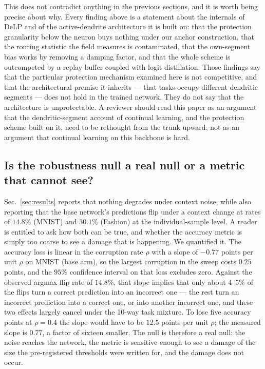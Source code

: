 \documentclass[10pt]{article}
\begin{document}
This does not contradict anything in the previous sections, and it is
worth being precise about why. Every finding above is a statement about
the internals of DeLP and of the active-dendrite architecture it is built
on: that the protection granularity below the neuron buys nothing under
our anchor construction, that the routing statistic the field measures
is contaminated, that the own-segment bias works by removing a damping
factor, and that the whole scheme is outcompeted by a replay buffer
coupled with logit distillation. Those findings say that the particular
protection mechanism examined here is not competitive, and that the
architectural premise it inherits --- that tasks occupy different
dendritic segments --- does not hold in the trained network. They do not
say that the architecture is unprotectable. A reviewer should read this
paper as an argument that the dendritic-segment account of continual
learning, and the protection scheme built on it, need to be rethought
from the trunk upward, not as an argument that continual learning on this
backbone is hard.

\subsection{Is the robustness null a real null or a metric that cannot
see?}
\label{sec:ctrl-metric}

Sec.~\ref{sec:results} reports that nothing degrades under context
noise, while also reporting that the base network's predictions flip
under a context change at rates of $14.8\%$ (MNIST) and $30.1\%$ (Fashion)
at the individual-sample level. A reader is entitled to ask how both can
be true, and whether the accuracy metric is simply too coarse to see a
damage that is happening. We quantified it. The accuracy loss is linear
in the corruption rate $\rho$ with a slope of $-0.77$ points per unit
$\rho$ on MNIST (base arm), so the largest corruption in the sweep costs
$0.25$ points, and the $95\%$ confidence interval on that loss excludes
zero. Against the observed argmax flip rate of $14.8\%$, that slope
implies that only about $4$--$5\%$ of the flips turn a correct prediction
into an incorrect one --- the rest turn an incorrect prediction into a
correct one, or into another incorrect one, and these two effects
largely cancel under the 10-way task mixture. To lose five accuracy
points at $\rho=0.4$ the slope would have to be $12.5$ points per unit
$\rho$; the measured slope is $0.77$, a factor of sixteen smaller. The
null is therefore a real null: the noise reaches the network, the metric
is sensitive enough to see a damage of the size the pre-registered
thresholds were written for, and the damage does not occur.
\end{document}
